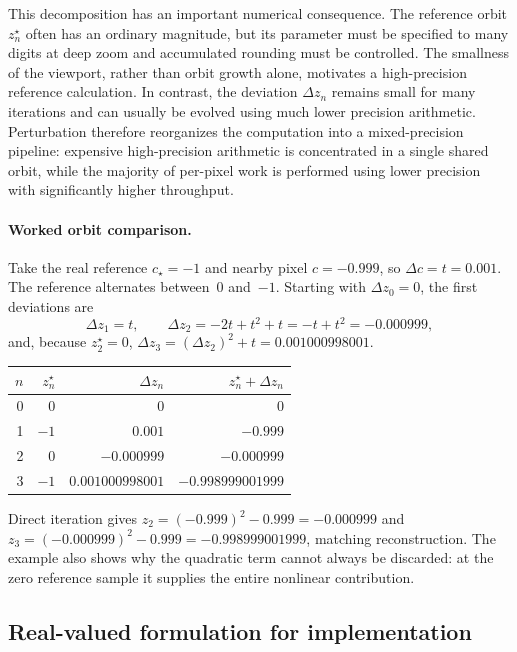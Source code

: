This decomposition has an important numerical consequence. The reference orbit
\(z_n^\star\) often has an ordinary magnitude, but its parameter must be specified
to many digits at deep zoom and accumulated rounding must be controlled. The
smallness of the viewport, rather than orbit growth alone, motivates a
high-precision reference calculation. In contrast, the deviation \(\Delta z_n\)
remains small for many iterations and can usually be evolved using much lower
precision arithmetic. Perturbation therefore reorganizes the computation into a
mixed-precision pipeline: expensive high-precision arithmetic is concentrated in
a single shared orbit, while the majority of per-pixel work is performed using
lower precision with significantly higher throughput.

\paragraph{Worked orbit comparison.}
Take the real reference $c_\star=-1$ and nearby pixel
$c=-0.999$, so $\Delta c=t=0.001$. The reference alternates between~0 and~$-1$.
Starting with $\Delta z_0=0$, the first deviations are
\[
\Delta z_1=t,\qquad
\Delta z_2=-2t+t^2+t=-t+t^2=-0.000999,
\]
and, because $z_2^\star=0$,
$\Delta z_3=(\Delta z_2)^2+t=0.001000998001$.
\begin{center}
\begin{tabular}{rrrr}
\hline
$n$ & $z_n^\star$ & $\Delta z_n$ & $z_n^\star+\Delta z_n$\\
\hline
0 & 0 & 0 & 0\\
1 & $-1$ & $0.001$ & $-0.999$\\
2 & 0 & $-0.000999$ & $-0.000999$\\
3 & $-1$ & $0.001000998001$ & $-0.998999001999$\\
\hline
\end{tabular}
\end{center}
Direct iteration gives $z_2=(-0.999)^2-0.999=-0.000999$ and
$z_3=(-0.000999)^2-0.999=-0.998999001999$, matching reconstruction.
The example also shows why the quadratic term cannot always be discarded:
at the zero reference sample it supplies the entire nonlinear contribution.

\subsection{Real-valued formulation for implementation}

